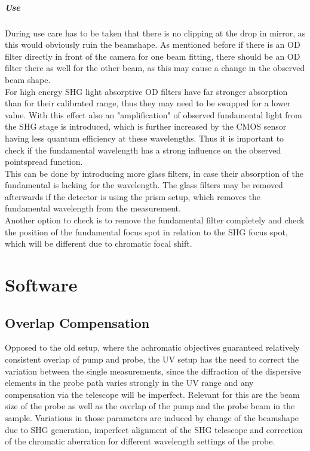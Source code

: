 \documentclass[twoside,openright]{scrreprt}
\begin{document}
\paragraph{Use}
During use care has to be taken that there is no clipping at the drop in mirror, as this would obviously ruin the beamshape. As mentioned before if there is an OD filter directly in front of the camera for one beam fitting, there should be an OD filter there as well for the other beam, as this may cause a change in the observed beam shape.\\
For high energy SHG light absorptive OD filters have far stronger absorption than for their calibrated range, thus they may need to be swapped for a lower value. With this effect also an "amplification" of observed fundamental light from the SHG stage is introduced, which is further increased by the CMOS sensor having less quantum efficiency at these wavelengths. Thus it is important to check if the fundamental wavelength has a strong influence on the observed pointspread function.\\
This can be done by introducing more glass filters, in case their absorption of the fundamental is lacking for the wavelength. The glass filters may be removed afterwards if the detector is using the prism setup, which removes the fundamental wavelength from the measurement.\\
Another option to check is to remove the fundamental filter completely and check the position of the fundamental focus spot in relation to the SHG focus spot, which will be different due to chromatic focal shift.


\chapter{Software}
\section{Overlap Compensation}
Opposed to the old setup, where the achromatic objectives guaranteed relatively consistent overlap of pump and probe, the UV setup has the need to correct the variation between the single measurements, since the diffraction of the dispersive elements in the probe path varies strongly in the UV range and any compensation via the telescope will be imperfect.\newline
Relevant for this are the beam size of the probe as well as the overlap of the pump and the probe beam in the sample. Variations in those parameters are induced by change of the beamshape due to SHG generation, imperfect alignment of the SHG telescope and correction of the chromatic aberration for different wavelength settings of the probe.\newline
\end{document}
